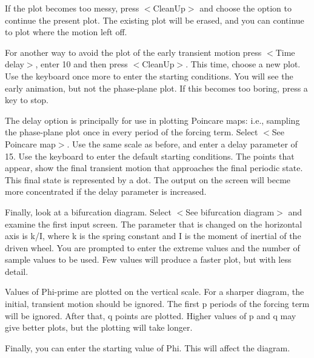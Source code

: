    If the plot becomes too messy, press $<$CleanUp$>$ and choose the option
to continue the present plot. The existing plot will be erased, and you
can continue to plot where the motion left off.

   For another way to avoid the plot of the early transient motion
press $<$Time delay$>$, enter 10 and then press $<$CleanUp$>$. This time,
choose a new plot. Use the keyboard once more to enter the starting
conditions. You will see the early animation, but not the phase-plane
plot. If this becomes too boring, press a key to stop.

   The delay option is principally for use in plotting Poincare maps:
i.e., sampling the phase-plane plot once in every period of the
forcing term. Select $<$See Poincare map$>$. Use the same scale as before,
and enter a delay parameter of 15. Use the keyboard to enter the default
starting conditions. The points that appear, show the final transient
motion that approaches the final periodic state. This final state is
represented by a dot. The output on the screen will becme more
concentrated if the delay parameter is increased.

   Finally, look at a bifurcation diagram. Select $<$See bifurcation
diagram$>$ and examine the first input screen. The parameter that is
changed on the horizontal axis is k/I, where k is the spring constant
and I is the moment of inertial of the driven wheel. You are
prompted to enter the extreme values and the number of sample values
to be used. Few values will produce a faster plot, but with less detail.

   Values of Phi-prime are plotted on the vertical scale. For a sharper
diagram, the initial, transient motion should be ignored. The first p
periods of the forcing term will be ignored. After that, q points are
plotted. Higher values of p and q may give better plots, but the plotting
will take longer.

   Finally, you can enter the starting value of Phi. This will
affect the diagram.



